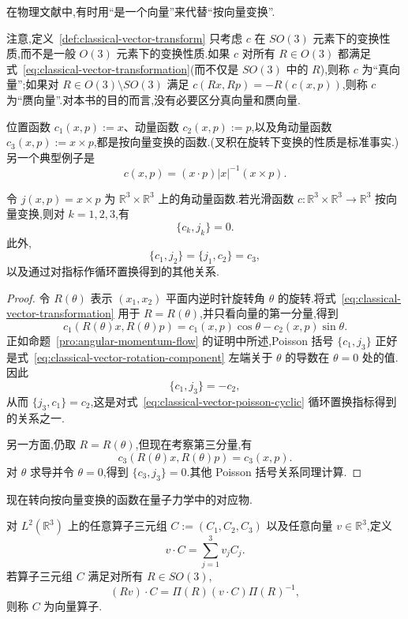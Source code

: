 在物理文献中,有时用“是一个向量”来代替“按向量变换”.

注意,定义~\ref{def:classical-vector-transform} 只考虑 $c$ 在 $SO(3)$ 元素下的变换性质,而不是一般 $O(3)$ 元素下的变换性质.如果 $c$ 对所有 $R\in O(3)$ 都满足式~\eqref{eq:classical-vector-transformation}(而不仅是 $SO(3)$ 中的 $R$),则称 $c$ 为“真向量”;如果对 $R\in O(3)\setminus SO(3)$ 满足 $c(Rx,Rp)=-R(c(x,p))$,则称 $c$ 为“赝向量”.对本书的目的而言,没有必要区分真向量和赝向量.

位置函数 $c_1(x,p):=x$、动量函数 $c_2(x,p):=p$,以及角动量函数 $c_3(x,p):=x\times p$,都是按向量变换的函数.(叉积在旋转下变换的性质是标准事实.)另一个典型例子是
\[
 c(x,p)=(x\cdot p)|x|^{-1}(x\times p).
\]

\begin{proposition}\label{prop:classical-vector-poisson-relations}
令 $j(x,p)=x\times p$ 为 $\mathbb R^3\times\mathbb R^3$ 上的角动量函数.若光滑函数 $c:\mathbb R^3\times\mathbb R^3\to\mathbb R^3$ 按向量变换,则对 $k=1,2,3$,有
\[
 \{c_k,j_k\}=0.
\label{eq:classical-vector-poisson-diagonal}
\]
此外,
\[
 \{c_1,j_2\}=\{j_1,c_2\}=c_3,
\label{eq:classical-vector-poisson-cyclic}
\]
以及通过对指标作循环置换得到的其他关系.
\end{proposition}

\begin{proof}
令 $R(\theta)$ 表示 $(x_1,x_2)$ 平面内逆时针旋转角 $\theta$ 的旋转.将式~\eqref{eq:classical-vector-transformation} 用于 $R=R(\theta)$,并只看向量的第一分量,得到
\[
 c_1(R(\theta)x,R(\theta)p)=c_1(x,p)\cos\theta-c_2(x,p)\sin\theta.
\label{eq:classical-vector-rotation-component}
\]
正如命题~\ref{pro:angular-momentum-flow} 的证明中所述,Poisson 括号 $\{c_1,j_3\}$ 正好是式~\eqref{eq:classical-vector-rotation-component} 左端关于 $\theta$ 的导数在 $\theta=0$ 处的值.因此
\[
 \{c_1,j_3\}=-c_2,
\]
从而 $\{j_3,c_1\}=c_2$,这是对式~\eqref{eq:classical-vector-poisson-cyclic} 循环置换指标得到的关系之一.

另一方面,仍取 $R=R(\theta)$,但现在考察第三分量,有
\[
 c_3(R(\theta)x,R(\theta)p)=c_3(x,p).
\]
对 $\theta$ 求导并令 $\theta=0$,得到 $\{c_3,j_3\}=0$.其他 Poisson 括号关系同理计算.
\end{proof}

现在转向按向量变换的函数在量子力学中的对应物.

\begin{definition}[向量算子]\label{def:vector-operator}
对 $L^2(\mathbb R^3)$ 上的任意算子三元组 $C:=(C_1,C_2,C_3)$ 以及任意向量 $v\in\mathbb R^3$,定义
\[
 v\cdot C=\sum_{j=1}^3v_jC_j.
\label{eq:vector-operator-component}
\]
若算子三元组 $C$ 满足对所有 $R\in SO(3)$,
\[
 (Rv)\cdot C=\Pi(R)(v\cdot C)\Pi(R)^{-1},
\label{eq:vector-operator-transformation}
\]
则称 $C$ 为向量算子.
\end{definition}

